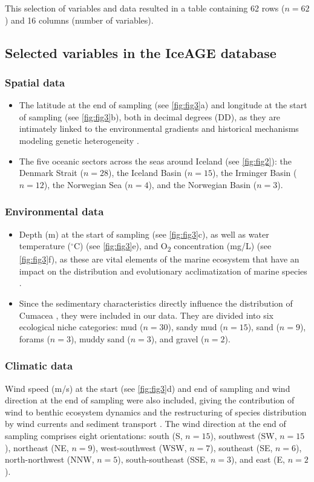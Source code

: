 This selection of variables and data resulted in a table containing 62 rows ($n=62$) and 16 columns (number of variables).

\subsection{Selected variables in the IceAGE database}
\subsubsection{Spatial data}
\begin{itemize}
\item The latitude at the end of sampling (see \autoref{fig:fig3}a) and longitude at the start of sampling (see \autoref{fig:fig3}b), both in decimal degrees (DD), as they are intimately linked to the environmental gradients and historical mechanisms modeling genetic heterogeneity \citep{gaither2013origins}.
\item The five oceanic sectors across the seas around Iceland (see \autoref{fig:fig2}): the Denmark Strait ($n=28$), the Iceland Basin ($n=15$), the Irminger Basin ($n=12$), the Norwegian Sea ($n=4$), and the Norwegian Basin ($n=3$).
\end{itemize}

\subsubsection{Environmental data}
\begin{itemize}
\item Depth (m) at the start of sampling (see \autoref{fig:fig3}c), as well as water temperature ($^\circ$C) (see \autoref{fig:fig3}e), and O\textsubscript{2} concentration (mg/L) (see \autoref{fig:fig3}f), as these are vital elements of the marine ecosystem that have an impact on the distribution and evolutionary acclimatization of marine species \citep{rex2006global, danovaro2010first}.
\item Since the sedimentary characteristics directly influence the distribution of Cumacea \citep{uhlir_adding_2021}, they were included in our data. They are divided into six ecological niche categories: mud ($n=30$), sandy mud ($n=15$), sand ($n=9$), forams ($n=3$), muddy sand ($n=3$), and gravel ($n=2$).
\end{itemize}

\subsubsection{Climatic data}
Wind speed (m/s) at the start (see \autoref{fig:fig3}d) and end of sampling and wind direction at the end of sampling were also included, giving the contribution of wind to benthic ecosystem dynamics and the restructuring of species distribution by wind currents and sediment transport \citep{siedlecki2016experiments, waga_recent_2020,saeedi_environmental_2022}. The wind direction at the end of sampling comprises eight orientations: south (S, $n=15$), southwest (SW, $n=15$), northeast (NE, $n=9$), west-southwest (WSW, $n=7$), southeast (SE, $n=6$), north-northwest (NNW, $n=5$), south-southeast (SSE, $n=3$), and east (E, $n=2$).

